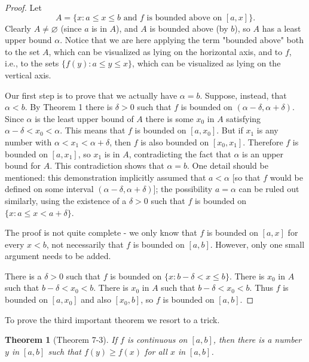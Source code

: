 \documentclass{article}
\newtheorem*{theorem*}{Theorem}
\begin{document}
\begin{proof}
  Let \begin{equation*}
    A = \{x: a \leq x \leq b \text{ and } f \text{ is bounded above on } [a,
      x]\}.
  \end{equation*}
  Clearly $A \neq \varnothing$ (since $a$ is in $A$), and $A$ is bounded above
  (by $b$), so $A$ has a least upper bound $\alpha$. Notice that we are here
  applying the term "bounded above" both to the set $A$, which can be
  visualized as lying on the horizontal axis, and to $f$, i.e., to the sets
  $\{f(y): a \leq y \leq x\}$, which can be visualized as lying on the vertical
  axis.

  Our first step is to prove that we actually have $\alpha = b$. Suppose,
  instead, that $\alpha < b$. By Theorem 1 there is $\delta > 0$ such that $f$
  is bounded on $(\alpha - \delta, \alpha + \delta)$. Since $\alpha$ is the
  least upper bound of $A$ there is some $x_0$ in $A$ satisfying $\alpha -
  \delta < x_0 < \alpha$. This means that $f$ is bounded on $[a, x_0]$. But if
  $x_1$ is any number with $\alpha < x_1 < \alpha + \delta$, then $f$ is also
  bounded on $[x_0, x_1]$. Therefore $f$ is bounded on $[a, x_1]$, so $x_1$ is
  in $A$, contradicting the fact that $\alpha$ is an upper bound for $A$. This
  contradiction shows that $\alpha = b$. One detail should be mentioned: this
  demonstration implicitly assumed that $a < \alpha$ [so that $f$ would be
  defined on some interval $(\alpha - \delta, \alpha + \delta)$]; the
  possibility $a = \alpha$ can be ruled out similarly, using the existence of a
  $\delta > 0$ such that $f$ is bounded on $\{x: a \leq x < a + \delta\}$.

  The proof is not quite complete - we only know that $f$ is bounded on $[a,
  x]$ for every $x < b$, not necessarily that $f$ is bounded on $[a, b]$.
  However, only one small argument needs to be added.

  There is a $\delta > 0$ such that $f$ is bounded on $\{x: b - \delta < x \leq
  b\}$. There is $x_0$ in $A$ such that $b - \delta < x_0 < b$. There is $x_0$
  in $A$ such that $b - \delta < x_0 < b$. Thus $f$ is bounded on $[a, x_0]$
  and also $[x_0, b]$, so $f$ is bounded on $[a, b]$.
\end{proof}

To prove the third important theorem we resort to a trick.

\begin{theorem*}[Theorem 7-3]
  If $f$ is continuous on $[a, b]$, then there is a number $y$ in $[a, b]$ such
  that $f(y) \geq f(x)$ for all $x$ in $[a, b]$.
\end{theorem*}
\end{document}
